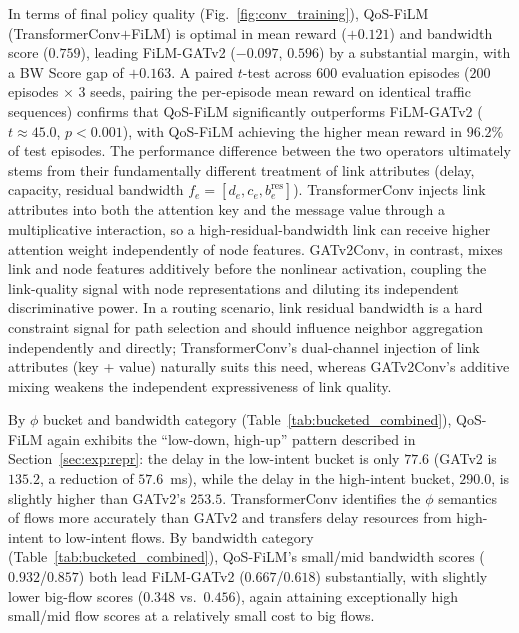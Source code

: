 In terms of final policy quality (Fig.~\ref{fig:conv_training}), QoS-FiLM (TransformerConv$+$FiLM) is optimal in mean reward ($+0.121$) and bandwidth score ($0.759$), leading FiLM-GATv2 ($-0.097$, $0.596$) by a substantial margin, with a BW Score gap of $+0.163$. A paired $t$-test across $600$ evaluation episodes ($200$ episodes $\times$ $3$ seeds, pairing the per-episode mean reward on identical traffic sequences) confirms that QoS-FiLM significantly outperforms FiLM-GATv2 ($t\!\approx\!45.0$, $p\!<\!0.001$), with QoS-FiLM achieving the higher mean reward in $96.2\%$ of test episodes. The performance difference between the two operators ultimately stems from their fundamentally different treatment of link attributes (delay, capacity, residual bandwidth $f_e=[d_e,c_e,b_e^{\text{res}}]$). 
TransformerConv injects link attributes into both the attention key and the message value through a multiplicative interaction, so a high-residual-bandwidth link can receive higher attention weight independently of node features. GATv2Conv, in contrast, mixes link and node features additively before the nonlinear activation, coupling the link-quality signal with node 
representations and diluting its independent discriminative power. In a routing scenario, link residual bandwidth is a hard constraint signal for path selection and should influence neighbor aggregation independently and directly; TransformerConv's dual-channel injection of link attributes (key + value) naturally suits this need, whereas GATv2Conv's additive mixing weakens the independent expressiveness of link quality.

By $\phi$ bucket and bandwidth category (Table~\ref{tab:bucketed_combined}), QoS-FiLM again exhibits the ``low-down, high-up'' pattern described in Section~\ref{sec:exp:repr}: the delay in the low-intent bucket is only $77.6$ (GATv2 is $135.2$, a reduction of $57.6$~ms), while the delay in the high-intent bucket, $290.0$, is slightly higher than GATv2's $253.5$. TransformerConv identifies the $\phi$ semantics of flows more accurately than GATv2 and transfers delay resources from high-intent to low-intent flows. By bandwidth category (Table~\ref{tab:bucketed_combined}), QoS-FiLM's small/mid bandwidth scores ($0.932$/$0.857$) both lead FiLM-GATv2 ($0.667$/$0.618$) substantially, with slightly lower big-flow scores ($0.348$ vs.\ $0.456$), again attaining exceptionally high small/mid flow scores at a relatively small cost to big flows.

